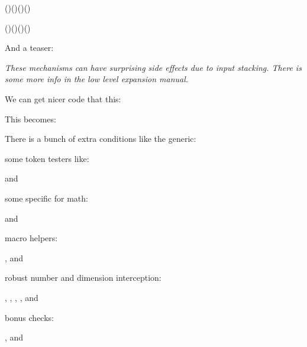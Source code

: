 \edef\oof{(\foo)(\foo)(\foo)(\foo)}
\edef\ofo{(\expand\foo)(\expand\foo)(\expand\foo)(\expand\foo)}

\meaning\oof \par \meaning\ofo
\stopbuffer

\typebuffer

{\tttf \getbuffer}

And a teaser:

\starttyping
\protected{}
\stoptyping

{\em These mechanisms can have surprising side effects due to input stacking.
There is some more info in the low level expansion manual.}

\stoptitle

\starttitle[title=Conditionals]

We can get nicer code that this:

\starttyping
\ifdim\scratchdimen=10pt
   \expandafter\one
\else\ifnum\scratchcounter=20
   \expandafter\expandafter\expandafter\two
\else
   \expandafter\expandafter\expandafter\three
\fi\fi
\stoptyping

This becomes:

\starttyping
\ifdim\scratchdimen=10pt
   \expandafter\one
\orelse\ifnum\scratchcounter=20
   \expandafter\two
\else
   \expandafter\three
\fi
\stoptyping

\page

There is a bunch of extra conditions like the generic:

\startnarrower \type {\ifcondition} \stopnarrower

some token testers like:

\startnarrower \type {\iftok} and  \stopnarrower

some specific for math:

\startnarrower \type {\ifmathstyle} and \type {\ifmathparameter} \stopnarrower

macro helpers:

\startnarrower \type {\ifarguments}, \type {\ifboolean} and \type {\ifempty} \stopnarrower

robust number and dimension interception:

\startnarrower \type {\ifchknum}, \type {\ifchkdim}, \type {\ifcmpnum}, \type {\ifcmpdim)}, \type {\ifnumval} and \type {\ifdimval} \stopnarrower

bonus checks:

\startnarrower \type {\iffrozen}, \type {\ifprotected} and \type {\ifusercmd} \stopnarrower

